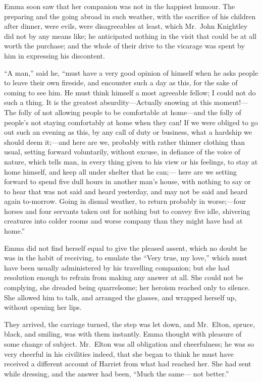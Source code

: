 Emma soon saw that her companion was not in the happiest humour.
The preparing and the going abroad in such weather, with the sacrifice
of his children after dinner, were evils, were disagreeables at least,
which Mr.\ John Knightley did not by any means like; he anticipated
nothing in the visit that could be at all worth the purchase;
and the whole of their drive to the vicarage was spent by him in
expressing his discontent.

``A man,'' said he, ``must have a very good opinion of himself when
he asks people to leave their own fireside, and encounter such
a day as this, for the sake of coming to see him.  He must think
himself a most agreeable fellow; I could not do such a thing.
It is the greatest absurdity---Actually snowing at this moment!---%
The folly of not allowing people to be comfortable at home---and the
folly of people's not staying comfortably at home when they can!
If we were obliged to go out such an evening as this, by any call of
duty or business, what a hardship we should deem it;---and here are we,
probably with rather thinner clothing than usual, setting forward
voluntarily, without excuse, in defiance of the voice of nature,
which tells man, in every thing given to his view or his feelings,
to stay at home himself, and keep all under shelter that he can;---%
here are we setting forward to spend five dull hours in another
man's house, with nothing to say or to hear that was not said
and heard yesterday, and may not be said and heard again to-morrow.
Going in dismal weather, to return probably in worse;---four horses
and four servants taken out for nothing but to convey five idle,
shivering creatures into colder rooms and worse company than they
might have had at home.''

Emma did not find herself equal to give the pleased assent, which no doubt
he was in the habit of receiving, to emulate the ``Very true, my love,''
which must have been usually administered by his travelling companion;
but she had resolution enough to refrain from making any answer
at all.  She could not be complying, she dreaded being quarrelsome;
her heroism reached only to silence.  She allowed him to talk,
and arranged the glasses, and wrapped herself up, without opening
her lips.

They arrived, the carriage turned, the step was let down,
and Mr.\ Elton, spruce, black, and smiling, was with them instantly.
Emma thought with pleasure of some change of subject.  Mr.\ Elton
was all obligation and cheerfulness; he was so very cheerful
in his civilities indeed, that she began to think he must have
received a different account of Harriet from what had reached her.
She had sent while dressing, and the answer had been, ``Much the same---%
not better.''

